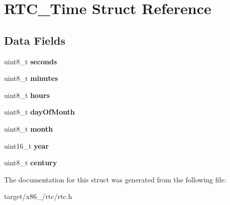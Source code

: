 \hypertarget{structRTC__Time}{}\section{R\+T\+C\+\_\+\+Time Struct Reference}
\label{structRTC__Time}
\subsection*{Data Fields}
\begin{DoxyCompactItemize}
\item 
uint8\+\_\+t {\bfseries seconds}\hypertarget{structRTC__Time_afeacbd24b83d32aa12f891da88a22292}{}\label{structRTC__Time_afeacbd24b83d32aa12f891da88a22292}

\item 
uint8\+\_\+t {\bfseries minutes}\hypertarget{structRTC__Time_a9fe2e6fe206a73e74659c55b081a29de}{}\label{structRTC__Time_a9fe2e6fe206a73e74659c55b081a29de}

\item 
uint8\+\_\+t {\bfseries hours}\hypertarget{structRTC__Time_ad1af8d0c97eb4bfeaecb18f66bfe56dd}{}\label{structRTC__Time_ad1af8d0c97eb4bfeaecb18f66bfe56dd}

\item 
uint8\+\_\+t {\bfseries day\+Of\+Month}\hypertarget{structRTC__Time_a8692b2e699a1c9d919dd239afa50a951}{}\label{structRTC__Time_a8692b2e699a1c9d919dd239afa50a951}

\item 
uint8\+\_\+t {\bfseries month}\hypertarget{structRTC__Time_a609ba35f08ad03d7f9d24767c336700e}{}\label{structRTC__Time_a609ba35f08ad03d7f9d24767c336700e}

\item 
uint16\+\_\+t {\bfseries year}\hypertarget{structRTC__Time_a8150fb6954121525f607f50093caebd4}{}\label{structRTC__Time_a8150fb6954121525f607f50093caebd4}

\item 
uint8\+\_\+t {\bfseries century}\hypertarget{structRTC__Time_a35d7a6202039252135a1f8e75edf6b1c}{}\label{structRTC__Time_a35d7a6202039252135a1f8e75edf6b1c}

\end{DoxyCompactItemize}


The documentation for this struct was generated from the following file\+:\begin{DoxyCompactItemize}
\item 
target/x86\+\_/rtc/rtc.\+h\end{DoxyCompactItemize}

